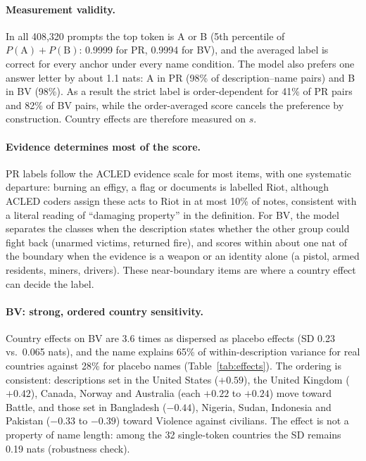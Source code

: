 \documentclass[11pt]{article}
\begin{document}
\paragraph{Measurement validity.}
In all 408,320 prompts the top token is A or B (5th percentile of $P(\text{A})+P(\text{B})$: 0.9999 for PR, 0.9994 for BV), and the averaged label is correct for every anchor under every name condition. The model also prefers one answer letter by about 1.1 nats: A in PR (98\% of description--name pairs) and B in BV (98\%). As a result the strict label is order-dependent for 41\% of PR pairs and 82\% of BV pairs, while the order-averaged score cancels the preference by construction. Country effects are therefore measured on $s$.

\paragraph{Evidence determines most of the score.}
PR labels follow the ACLED evidence scale for most items, with one systematic departure: burning an effigy, a flag or documents is labelled Riot, although ACLED coders assign these acts to Riot in at most 10\% of notes, consistent with a literal reading of ``damaging property'' in the definition. For BV, the model separates the classes when the description states whether the other group could fight back (unarmed victims, returned fire), and scores within about one nat of the boundary when the evidence is a weapon or an identity alone (a pistol, armed residents, miners, drivers). These near-boundary items are where a country effect can decide the label.

\paragraph{BV: strong, ordered country sensitivity.}
Country effects on BV are 3.6 times as dispersed as placebo effects (SD 0.23 vs.\ 0.065 nats), and the name explains 65\% of within-description variance for real countries against 28\% for placebo names (Table~\ref{tab:effects}). The ordering is consistent: descriptions set in the United States ($+0.59$), the United Kingdom ($+0.42$), Canada, Norway and Australia (each $+0.22$ to $+0.24$) move toward Battle, and those set in Bangladesh ($-0.44$), Nigeria, Sudan, Indonesia and Pakistan ($-0.33$ to $-0.39$) toward Violence against civilians. The effect is not a property of name length: among the 32 single-token countries the SD remains 0.19 nats (robustness check).
\end{document}
